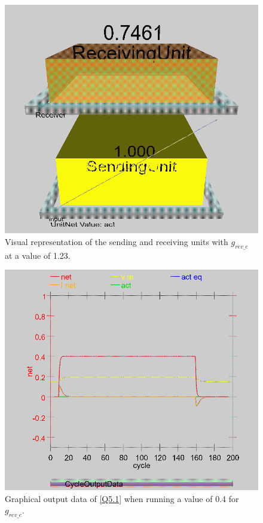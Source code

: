 \begin{multicols}{2}
\begin{figure}[H]
\centering
\includegraphics[scale=0.225]{Media/Main/EQ1/2.5.S3.png}
\caption{Visual representation of the sending and receiving units with $g_{rev\_e}$ at a value of 1.23.}
\label{Q5.3}
\end{figure}

\begin{figure}[H]
\centering
\includegraphics[scale=0.3]{Media/Main/EQ1/2.5.S1G.png}
\caption{Graphical output data of \cref{Q5.1} when running a value of 0.4 for $g_{rev\_e}$.}
\label{Q5.4}
\end{figure}


\end{multicols}
